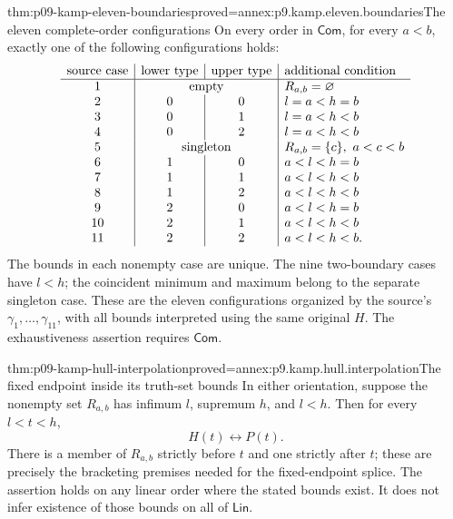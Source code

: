 \begin{hblemma}{thm:p09-kamp-eleven-boundaries}{proved=annex:p9.kamp.eleven.boundaries}{The eleven complete-order configurations}
On every order in \(\mathsf{Com}\), for every \(a<b\), exactly
one of the following configurations holds:
\[
\begin{array}{c|c|c|l}
 \text{source case}&\text{lower type}&\text{upper type}&\text{additional condition}\\ \hline
 1&\multicolumn{2}{c|}{\text{empty}}&R_{a,b}=\varnothing\\
 2&0&0&l=a<h=b\\
 3&0&1&l=a<h<b\\
 4&0&2&l=a<h<b\\
 5&\multicolumn{2}{c|}{\text{singleton}}&R_{a,b}=\{c\},\ a<c<b\\
 6&1&0&a<l<h=b\\
 7&1&1&a<l<h<b\\
 8&1&2&a<l<h<b\\
 9&2&0&a<l<h=b\\
 10&2&1&a<l<h<b\\
 11&2&2&a<l<h<b.
\end{array}
\]
The bounds in each nonempty case are unique. The nine two-boundary
cases have \(l<h\); the coincident minimum and maximum belong to
the separate singleton case. These are the eleven configurations
organized by the source's \(\gamma_1,\ldots,\gamma_{11}\),
with all bounds interpreted using the same original \(H\).
The exhaustiveness assertion requires \(\mathsf{Com}\).
\end{hblemma}

\begin{hblemma}{thm:p09-kamp-hull-interpolation}{proved=annex:p9.kamp.hull.interpolation}{The fixed endpoint inside its truth-set bounds}
In either orientation, suppose the nonempty set \(R_{a,b}\)
has infimum \(l\), supremum \(h\), and \(l<h\).
Then for every \(l<t<h\),
\[
                            H(t)\longleftrightarrow P(t).
\]
There is a member of \(R_{a,b}\) strictly before \(t\) and
one strictly after \(t\); these are precisely the bracketing
premises needed for the fixed-endpoint splice. The assertion holds
on any linear order where the stated bounds exist. It does not
infer existence of those bounds on all of \(\mathsf{Lin}\).
\end{hblemma}

